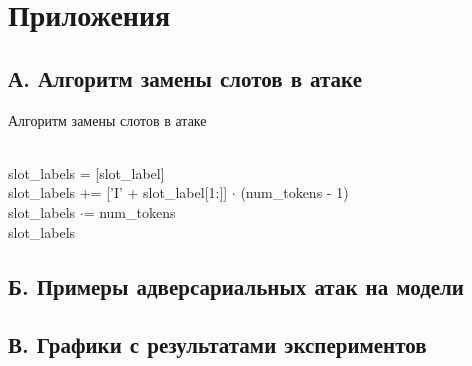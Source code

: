 \section*{Приложения}

\subsection*{А. Алгоритм замены слотов в атаке}

\begin{algorithm}
    \caption{Алгоритм замены слотов в атаке}
    \begin{algorithmic}
            \\
            \ind slot\_labels = [slot\_label]
            \ind{}
                    \ind\ind{}
                                \\
                                \ind\ind\ind slot\_labels += ['I' + slot\_label[1:]] $\cdot$ (num\_tokens - 1)
                    \Else
                                \\
                                \ind\ind\ind slot\_labels $\cdot$= num\_tokens
                    \EndIf
            \EndIf \\
            \ind\Return slot\_labels
        \EndFunction
    \end{algorithmic}\label{alg:algorithm3}
\end{algorithm}

\subsection*{Б. Примеры адверсариальных атак на модели}




\subsection*{В. Графики с результатами экспериментов}

